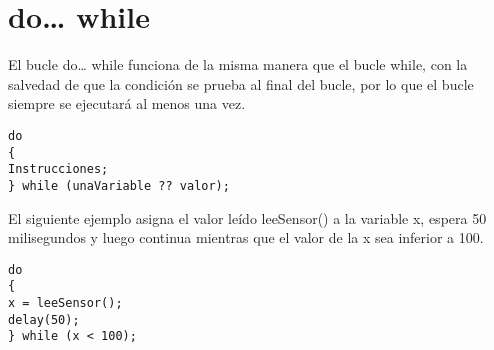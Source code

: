 \section{do… while}

El bucle do… while funciona de la misma manera que el bucle while, con la salvedad de que la condición se prueba al final del bucle, por lo que el bucle siempre se ejecutará al menos una vez.
\begin{lstlisting}
do
{
Instrucciones;
} while (unaVariable ?? valor);
\end{lstlisting}
El siguiente ejemplo asigna el valor leído leeSensor() a la variable x, espera 50 milisegundos y luego continua mientras que el valor de la x sea inferior a 100.
\begin{lstlisting}
do
{
x = leeSensor();
delay(50);
} while (x < 100);
\end{lstlisting}